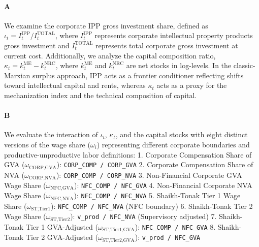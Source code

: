 \documentclass[11pt,a4paper]{article}
\begin{document}
\paragraph{A}
We examine the corporate IPP gross investment share, defined as $\iota_t = I^{\text{IPP}}_t / I^{\text{TOTAL}}_t$, where $I^{\text{IPP}}_t$ represents corporate intellectual property products gross investment and $I^{\text{TOTAL}}_t$ represents total corporate gross investment at current cost. Additionally, we analyze the capital composition ratio, $\kappa_t = k^{\text{ME}}_t - k^{\text{NRC}}_t$, where $k^{\text{ME}}_t$ and $k^{\text{NRC}}_t$ are net stocks in log-levels. In the classic-Marxian surplus approach, IPP acts as a frontier conditioner reflecting shifts toward intellectual capital and rents, whereas $\kappa_t$ acts as a proxy for the mechanization index and the technical composition of capital.

\paragraph{B}
We evaluate the interaction of $\iota_t$, $\kappa_t$, and the capital stocks with eight distinct versions of the wage share ($\omega_i$) representing different corporate boundaries and productive-unproductive labor definitions:
1. Corporate Compensation Share of GVA ($\omega_{\text{CORP,GVA}}$): \texttt{CORP\_COMP / CORP\_GVA}
2. Corporate Compensation Share of NVA ($\omega_{\text{CORP,NVA}}$): \texttt{CORP\_COMP / CORP\_NVA}
3. Non-Financial Corporate GVA Wage Share ($\omega_{\text{NFC,GVA}}$): \texttt{NFC\_COMP / NFC\_GVA}
4. Non-Financial Corporate NVA Wage Share ($\omega_{\text{NFC,NVA}}$): \texttt{NFC\_COMP / NFC\_NVA}
5. Shaikh-Tonak Tier 1 Wage Share ($\omega_{\text{ST,Tier1}}$): \texttt{NFC\_COMP / NFC\_NVA} (NFC boundary)
6. Shaikh-Tonak Tier 2 Wage Share ($\omega_{\text{ST,Tier2}}$): \texttt{v\_prod / NFC\_NVA} (Supervisory adjusted)
7. Shaikh-Tonak Tier 1 GVA-Adjusted ($\omega_{\text{ST,Tier1,GVA}}$): \texttt{NFC\_COMP / NFC\_GVA}
8. Shaikh-Tonak Tier 2 GVA-Adjusted ($\omega_{\text{ST,Tier2,GVA}}$): \texttt{v\_prod / NFC\_GVA}
\end{document}
